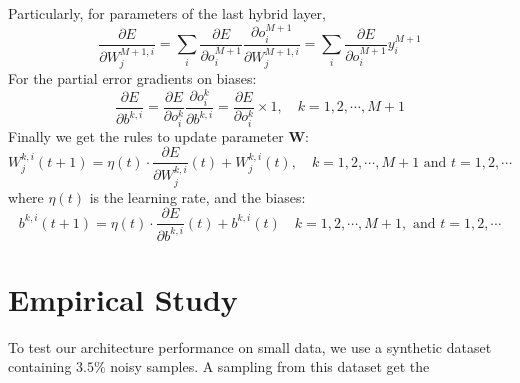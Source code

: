 \documentclass[3p,times,procedia]{elsarticle}
\begin{document}
Particularly, for parameters of the last 
hybrid layer,
\begin{equation}
	\frac{\partial E}
	{\partial W_j^{M+1,i}}=\sum_i
	\frac{\partial E}
	{\partial o_i^{M+1}}
	\frac{\partial o_i^{M+1}}
	{\partial W_j^{M+1,i}}=\sum_i
	\frac{\partial E}
	{\partial o_i^{M+1}}
	y_i^{M+1}
	\label{eq:28}
\end{equation}
For the partial error gradients on biases:
\begin{equation}
	\frac{\partial E}
	{\partial b^{k,i}}=
	\frac{\partial E}
	{\partial o_i^k}
	\frac{\partial o_i^k}
	{\partial b^{k,i}}=
	\frac{\partial E}
	{\partial o_i^k}
	\times 1,
	\quad k=1,2,\cdots,M+1
	\label{eq:29}
\end{equation}
Finally we get the rules to update parameter
$\mathbf{W}$:
\begin{equation}
	W_j^{k,i}(t+1) = \eta(t)\cdot
	\frac{\partial E}{\partial W_j^{k,i}}(t)+
	W_j^{k,i}(t),
	\quad k=1,2,\cdots,M+1
	\text{ and }
	t=1,2,\cdots
	\label{eq:30}
\end{equation}
where $\eta(t)$ is the learning rate, and 
the biases:
\begin{equation}
	b^{k,i}(t+1) = \eta(t)\cdot
	\frac{\partial E}{\partial b^{k,i}}(t)+
	b^{k,i}(t)
	\quad k=1,2,\cdots,M+1,
	\text{ and }
	t=1,2,\cdots
	\label{eq:31}
\end{equation}

\section{Empirical Study}
To test our architecture performance on small data, we 
use a synthetic dataset containing $3.5\%$ noisy samples. 
A sampling from this dataset get the
\end{document}
